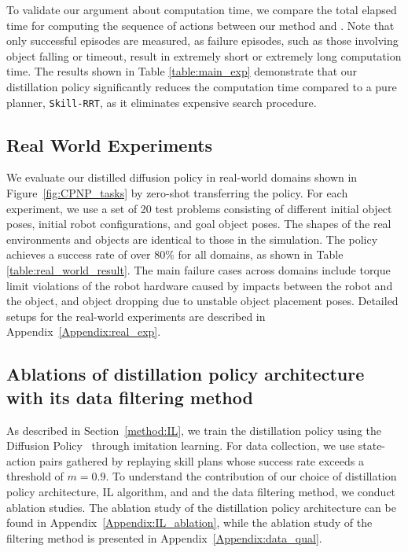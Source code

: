 To validate our argument about computation time, we compare the total elapsed time for computing the sequence of actions between our method and \skillrrt{}. Note that only successful episodes are measured, as failure episodes, such as those involving object falling or timeout, result in extremely short or extremely long computation time. The results shown in Table \ref{table:main_exp} demonstrate that our distillation policy significantly reduces the computation time compared to a pure planner, \texttt{Skill-RRT}, as it eliminates expensive search procedure.



\subsection{Real World Experiments}
We evaluate our distilled diffusion policy in real-world domains shown in Figure~\ref{fig:CPNP_tasks} by zero-shot transferring the policy. For each experiment, we use a set of 20 test problems consisting of different initial object poses, initial robot configurations, and goal object poses. The shapes of the real environments and objects are identical to those in the simulation. The policy achieves a success rate of over 80\% for all domains, as shown in Table \ref{table:real_world_result}. The main failure cases across domains include torque limit violations of the robot hardware caused by impacts between the robot and the object, and object dropping due to unstable object placement poses. Detailed setups for the real-world experiments are described in Appendix~\ref{Appendix:real_exp}.



\subsection{Ablations of distillation policy architecture with its data filtering method} 

As described in Section~\ref{method:IL}, we train the distillation policy using the Diffusion Policy~\cite{chi2023diffusion} through imitation learning. For data collection, we use state-action pairs gathered by replaying skill plans whose success rate exceeds a threshold of \( m = 0.9 \). To understand the contribution of our choice of distillation policy architecture, IL algorithm, and and the data filtering method, we conduct ablation studies. The ablation study of the distillation policy architecture can be found in Appendix~\ref{Appendix:IL_ablation}, while the ablation study of the filtering method is presented in Appendix~\ref{Appendix:data_qual}.

